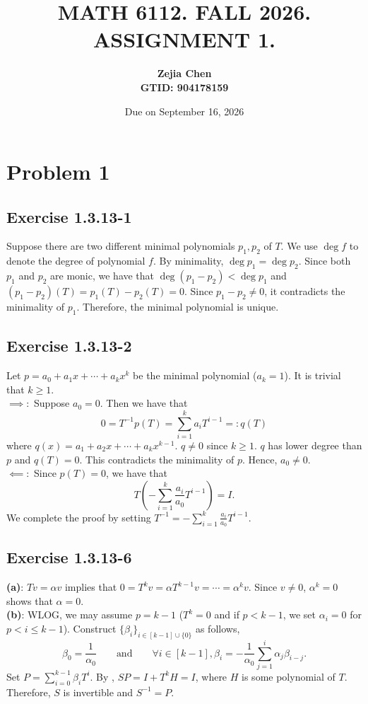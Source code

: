 \documentclass[11pt]{article}
\title{MATH 6112. FALL 2026. ASSIGNMENT 1.}
\date{Due on September 16, 2026}
\author{{\textbf{Zejia Chen}} \\ \textbf{GTID: 904178159}}
\theoremstyle{plain}
\theoremstyle{definition}
\theoremstyle{remark}
\newcommand{\tuple}[1]{\left(#1\right)}
\newcommand{\tp}{\tuple}
\begin{document}
\maketitle
\section*{Problem 1}
\subsection*{Exercise 1.3.13-1}
Suppose there are two different minimal polynomials $p_1,p_2$ of $T$.
We use $\deg f$ to denote the degree of polynomial $f$.
By minimality, $\deg p_1 = \deg p_2$.
Since both $p_1$ and $p_2$ are monic, we have that $\deg (p_1-p_2) < \deg p_1$ and $(p_1-p_2)(T) = p_1(T)-p_2(T) = 0$.
Since $p_1-p_2\neq 0$, it contradicts the minimality of $p_1$.
Therefore, the minimal polynomial is unique.
\subsection*{Exercise 1.3.13-2}
Let $p = a_0 + a_1x + \cdots + a_kx^k$ be the minimal polynomial ($a_k=1$).
It is trivial that $k\geq 1$.
\\$\boldsymbol{\implies}:$ Suppose $a_0 = 0$. 
Then we have that
$$
    0 = T^{-1}p(T) = \sum_{i=1}^k a_i T^{i-1} =: q(T)
$$
where $q(x) = a_1+a_2x+\cdots+a_k x^{k-1}$.
$q\neq 0$ since $k\geq 1$.
$q$ has lower degree than $p$ and $q(T) = 0$.
This contradicts the minimality of $p$.
Hence, $a_0\neq 0$.
\\$\boldsymbol{\impliedby}:$
Since $p(T) = 0$, we have that
$$
    T\tp{-\sum_{i=1}^k \frac{a_i}{a_0}T^{i-1}} = I .
$$
We complete the proof by setting $T^{-1} = -\sum_{i=1}^k \frac{a_i}{a_0}T^{i-1}$.
\subsection*{Exercise 1.3.13-6}
\textbf{(a)}: $Tv = \alpha v$ implies that $0 = T^k v = \alpha T^{k-1}v =\cdots = \alpha^k v$.
Since $v\neq 0$, $\alpha^k = 0$ shows that $\alpha = 0$.
\\\textbf{(b)}: WLOG, we may assume $p=k-1$ ($T^k=0$ and if \(p<k-1\), we set \(\alpha_i=0\) for \(p<i\le k-1\)).
Construct $\{\beta_i\}_{i\in [k-1]\cup\{0\}}$ as follows,
\begin{equation}\label{eq:bP1_beta}
    \beta_0 = \frac 1{\alpha_0}\qquad\text{and}\qquad\forall i\in[k-1], \beta_i = -\frac 1{\alpha_0}\sum_{j=1}^i \alpha_j\beta_{i-j}.
\end{equation}
Set $P = \sum_{i=0}^{k-1}\beta_i T^i$.
By , $SP = I + T^kH = I$, where $H$ is some polynomial of $T$.
Therefore, $S$ is invertible and $S^{-1}=P$.
\end{document}
